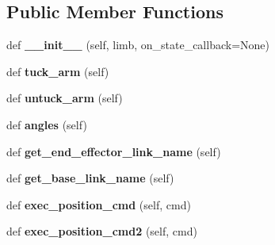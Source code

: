 \subsection*{Public Member Functions}
\begin{DoxyCompactItemize}
\item 
\hypertarget{classaml__robot_1_1baxter__robot_1_1_baxter_arm_a72a5c161c29bd536c6a8727d3138643a}{}\label{classaml__robot_1_1baxter__robot_1_1_baxter_arm_a72a5c161c29bd536c6a8727d3138643a} 
def {\bfseries \+\_\+\+\_\+init\+\_\+\+\_\+} (self, limb, on\+\_\+state\+\_\+callback=None)
\item 
\hypertarget{classaml__robot_1_1baxter__robot_1_1_baxter_arm_add8768944b81542e122c676f2b38c075}{}\label{classaml__robot_1_1baxter__robot_1_1_baxter_arm_add8768944b81542e122c676f2b38c075} 
def {\bfseries tuck\+\_\+arm} (self)
\item 
\hypertarget{classaml__robot_1_1baxter__robot_1_1_baxter_arm_af3664aaae25213bf3930c821cbf68432}{}\label{classaml__robot_1_1baxter__robot_1_1_baxter_arm_af3664aaae25213bf3930c821cbf68432} 
def {\bfseries untuck\+\_\+arm} (self)
\item 
\hypertarget{classaml__robot_1_1baxter__robot_1_1_baxter_arm_a0434abfd5899e880a6856444ccc9ecae}{}\label{classaml__robot_1_1baxter__robot_1_1_baxter_arm_a0434abfd5899e880a6856444ccc9ecae} 
def {\bfseries angles} (self)
\item 
\hypertarget{classaml__robot_1_1baxter__robot_1_1_baxter_arm_a40dc93e2269ea57aec71457431984bc0}{}\label{classaml__robot_1_1baxter__robot_1_1_baxter_arm_a40dc93e2269ea57aec71457431984bc0} 
def {\bfseries get\+\_\+end\+\_\+effector\+\_\+link\+\_\+name} (self)
\item 
\hypertarget{classaml__robot_1_1baxter__robot_1_1_baxter_arm_a3d7c1dd8493d6ed1255e856db43e4d9c}{}\label{classaml__robot_1_1baxter__robot_1_1_baxter_arm_a3d7c1dd8493d6ed1255e856db43e4d9c} 
def {\bfseries get\+\_\+base\+\_\+link\+\_\+name} (self)
\item 
\hypertarget{classaml__robot_1_1baxter__robot_1_1_baxter_arm_aa8fb038222939675c5038f546d0e2627}{}\label{classaml__robot_1_1baxter__robot_1_1_baxter_arm_aa8fb038222939675c5038f546d0e2627} 
def {\bfseries exec\+\_\+position\+\_\+cmd} (self, cmd)
\item 
\hypertarget{classaml__robot_1_1baxter__robot_1_1_baxter_arm_a292dff991a17cfdee36c6b07ed5b769c}{}\label{classaml__robot_1_1baxter__robot_1_1_baxter_arm_a292dff991a17cfdee36c6b07ed5b769c} 
def {\bfseries exec\+\_\+position\+\_\+cmd2} (self, cmd)
\item 

\end{DoxyCompactItemize}
